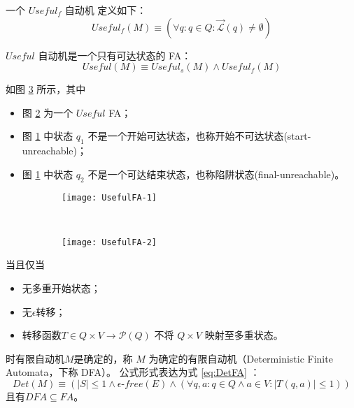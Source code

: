 \begin{definition}
    一个 $Useful_f$ 自动机 定义如下： 
    \[ Useful_f (M) \equiv ( \forall q:q \in Q : \overrightarrow{\mathcal{L}} (q) \not= \emptyset ) \]
\end{definition}

\begin{definition}
    $Useful$ 自动机是一个只有可达状态的 FA：
    \[ Useful (M) \equiv Useful_s (M) \land Useful_f (M) \]
\end{definition}

\begin{example}
    如图 \ref{fig:UsefulFA} 所示，其中
    \begin{itemize}
        \item 图 \ref{fig:UsefulFA-2} 为一个 $Useful$ FA；
        \item 图 \ref{fig:UsefulFA-1} 中状态 $q_1$ 不是一个开始可达状态，也称开始不可达状态(start-unreachable)；
        \item 图 \ref{fig:UsefulFA-1} 中状态 $q_2$ 不是一个可达结束状态，也称陷阱状态(final-unreachable)\cite{book1}。
    \end{itemize}
\end{example}

\begin{figure}[!htbp]
    \centering
    \begin{subfigure}[b]{0.45\textwidth}
        \texttt{[image: UsefulFA-1]}
        \caption{}
        \label{fig:UsefulFA-1}
    \end{subfigure}
    ~
    \begin{subfigure}[b]{0.45\textwidth}
        \texttt{[image: UsefulFA-2]}
        \caption{}
        \label{fig:UsefulFA-2}
    \end{subfigure}
    \caption{}
    \label{fig:UsefulFA}
\end{figure}

\begin{definition}
    当且仅当 
    \begin{itemize}
        \item 无多重开始状态；
        \item 无$\epsilon$转移；
        \item 转移函数$T \in Q \times V \longrightarrow \mathcal{P} (Q) $ 不将 $Q \times V$ 映射至多重状态。
    \end{itemize}
    时有限自动机$M$是确定的，称 $M$ 为确定的有限自动机（Deterministic Finite Automata，下称 DFA）。
    公式形式表达为式 \ref{eq:DetFA} ：
    \begin{equation}\label{eq:DetFA}
    Det(M) \equiv ( |S| \leq 1 \land \epsilon\mbox{-} free(E) \land ( \forall q,a:q \in Q \land a \in V : |T(q,a)| \leq 1 )) 
    \end{equation}
    且有$ DFA \subseteq FA$。
\end{definition}


